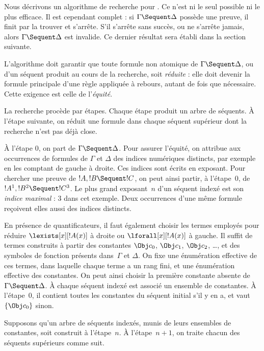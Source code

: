 \documentclass[../../../include/open-logic-section]{subfiles}
\begin{document}


Nous décrivons un algorithme de recherche pour .
Ce n'est ni le seul possible ni le plus efficace. Il est
cependant complet : si $\Gamma \Sequent \Delta$ possède
une preuve, il finit par la trouver et s'arrête.
S'il s'arrête sans succès, ou ne s'arrête jamais, alors
$\Gamma \Sequent \Delta$ est invalide. Ce dernier résultat
sera établi dans la section suivante.

L'algorithme doit garantir que toute formule non atomique
de $\Gamma \Sequent \Delta$, ou d'un séquent produit au
cours de la recherche, soit \emph{réduite} : elle doit
devenir la formule principale d'une règle appliquée
à rebours, autant de fois que nécessaire. Cette exigence
est celle de l'\emph{équité}.

La recherche procède par étapes. Chaque étape produit
un arbre de séquents. À l'étape suivante, on réduit une
formule dans chaque séquent supérieur dont la recherche
n'est pas déjà close.

À l'étape $0$, on part de $\Gamma \Sequent \Delta$.
Pour assurer l'équité, on attribue aux occurrences de
formules de $\Gamma$ et $\Delta$ des indices numériques
distincts, par exemple en les comptant de gauche à droite.
Ces indices sont écrits en exposant. Pour chercher une
preuve de $!A, !B \Sequent !C$, on peut ainsi partir,
à l'étape~$0$, de $!A^1, !B^2 \Sequent !C^3$.
Le plus grand exposant~$n$ d'un séquent indexé est
son \emph{indice maximal} : $3$ dans cet exemple.
Deux occurrences d'une même formule reçoivent elles
aussi des indices distincts.

En présence de quantificateurs, il faut également choisir
les termes employés pour réduire $\lexists[x][!A(x)]$
à droite ou $\lforall[x][!A(x)]$ à gauche.
Il suffit de termes construits à partir des constantes
$\Obj c_0$, $\Obj c_1$, $\Obj c_2$, \dots, et des symboles
de fonction présents dans~$\Gamma$ et $\Delta$.
On fixe une énumération effective de ces termes, dans
laquelle chaque terme a un rang fini, et une énumération
effective des constantes. On peut ainsi choisir la première
constante absente de $\Gamma \Sequent \Delta$.
À chaque séquent indexé est associé un ensemble
de constantes. À l'étape~$0$, il contient toutes
les constantes du séquent initial s'il y en a,
et vaut $\{\Obj c_0\}$ sinon.

Supposons qu'un arbre de séquents indexés, munis de
leurs ensembles de constantes, soit construit à
l'étape~$n$. À l'étape~$n+1$, on traite chacun des
séquents supérieurs comme suit.
\end{document}
